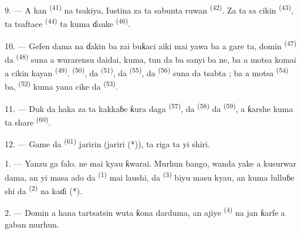 9. --- A kan  \textsuperscript{(41)} na
tsakiya, Iustina za ta sabunta ruwan 
\textsuperscript{(42)}. Za ta sa  cikin  \textsuperscript{(43)}, ta tsaftace 
\textsuperscript{(44)} ta kuma ɗauke 
\textsuperscript{(46)}.

10. --- Gefen dama na ɗakin ba zai buƙaci aiki mai yawa ba a gare
ta, domin  \textsuperscript{(47)} da
 \textsuperscript{(48)} suna a wurarensu daidai,
kuma, tun da ba sanyi ba ne, ba a motsa komai a cikin kayan
 \textsuperscript{(49)}. 
\textsuperscript{(50)}, da  \textsuperscript{(51)},
da  \textsuperscript{(55)}, da  \textsuperscript{(56)} suna da tsabta ; ba a motsa  \textsuperscript{(54)} ba, 
\textsuperscript{(52)} kuma yana cike da 
\textsuperscript{(53)}.



11. --- Duk da haka za ta kakkaɓe ƙura daga 
\textsuperscript{(57)}, da 
\textsuperscript{(58)} da  \textsuperscript{(59)},
a ƙarshe kuma ta share  \textsuperscript{(60)}.

12. --- Game da  \textsuperscript{(61)} jaririn (jariri
(*)), ta riga ta yi shiri.

\VUsaut{5.0mm}
\VUsaut{3.0mm}

1. --- Yanzu ga falo.  ne mai kyau ƙwarai. Murhun bango,
wanda yake a kusurwar dama, an yi masa ado da  \textsuperscript{(1)} mai laushi, da 
\textsuperscript{(3)} biyu masu kyau, an kuma lulluɓe shi da
 \textsuperscript{(2)} na kaɗi (*).

2. --- Domin a hana tartsatsin wuta ƙona darduma, an ajiye
 \textsuperscript{(4)} na jan ƙarfe a gaban
murhun.

